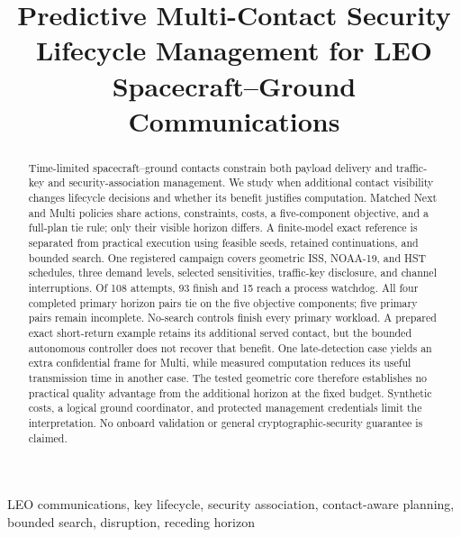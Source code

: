 \documentclass[conference]{IEEEtran}
\begin{document}
\title{
    Predictive Multi-Contact Security Lifecycle Management
    for LEO Spacecraft--Ground Communications
}

\author{
}

\maketitle


\begin{abstract}
Time-limited spacecraft--ground contacts constrain both payload
delivery and traffic-key and security-association management.
We study when additional contact visibility changes lifecycle
decisions and whether its benefit justifies computation.
Matched Next and Multi policies share actions, constraints,
costs, a five-component objective, and a full-plan tie rule;
only their visible horizon differs.
A finite-model exact reference is separated from practical
execution using feasible seeds, retained continuations, and
bounded search.
One registered campaign covers geometric ISS, NOAA-19, and HST
schedules, three demand levels, selected sensitivities,
traffic-key disclosure, and channel interruptions.
Of 108 attempts, 93 finish and 15 reach a process watchdog.
All four completed primary horizon pairs tie on the five
objective components; five primary pairs remain incomplete.
No-search controls finish every primary workload.
A prepared exact short-return example retains its additional
served contact, but the bounded autonomous controller does
not recover that benefit.
One late-detection case yields an extra confidential frame
for Multi, while measured computation reduces its useful
transmission time in another case.
The tested geometric core therefore establishes no practical
quality advantage from the additional horizon at the fixed
budget.
Synthetic costs, a logical ground coordinator, and protected
management credentials limit the interpretation.
No onboard validation or general cryptographic-security
guarantee is claimed.
\end{abstract}

\begin{IEEEkeywords}
LEO communications, key lifecycle, security association,
contact-aware planning, bounded search, disruption,
receding horizon
\end{IEEEkeywords}
\end{document}

